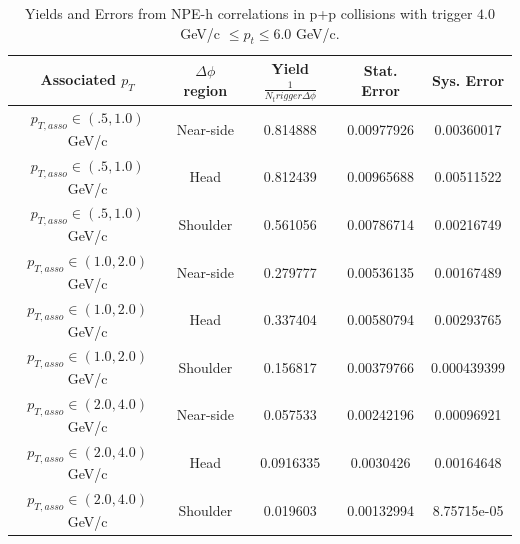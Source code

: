 \begin{table}
\centering
\begin{tabular}{|c|c|c|c|c|}
\hline
Associated $p_T$	& $\Delta\phi$ region & Yield $\frac{1}{N_trigger \Delta\phi}$ & Stat. Error & Sys. Error\\
\hline
$p_{T,asso} \in(.5, 1.0)$ GeV/c  & Near-side  &  0.814888 & 0.00977926 & 0.00360017 \\
\hline
$p_{T,asso} \in(.5, 1.0)$ GeV/c  & Head  &  0.812439 & 0.00965688 & 0.00511522 \\
\hline
$p_{T,asso} \in(.5, 1.0)$ GeV/c  & Shoulder & 0.561056 & 0.00786714 & 0.00216749\\ 
\hline
$p_{T,asso} \in(1.0, 2.0)$ GeV/c  & Near-side & 0.279777 & 0.00536135 & 0.00167489 \\ 
\hline
$p_{T,asso} \in(1.0, 2.0)$ GeV/c  & Head & 0.337404 & 0.00580794 & 0.00293765 \\
\hline
$p_{T,asso} \in(1.0, 2.0)$ GeV/c  & Shoulder & 0.156817 & 0.00379766 & 0.000439399 \\ 
\hline
$p_{T,asso} \in(2.0, 4.0)$ GeV/c  & Near-side & 0.057533 & 0.00242196 & 0.00096921 \\
\hline
$p_{T,asso} \in(2.0, 4.0)$ GeV/c  & Head & 0.0916335 & 0.0030426 & 0.00164648 \\
\hline
$p_{T,asso} \in(2.0, 4.0)$ GeV/c  & Shoulder & 0.019603 & 0.00132994 & 8.75715e-05 \\
\hline
\end{tabular}
\caption[Yields and Errors in p+p Correlations, Low Trigger]{Yields and Errors from NPE-h correlations in p+p collisions with trigger $4.0 $GeV/c $\leq p_t \leq 6.0$ GeV/c.}
\label{tab:ppyieldlow}
\end{table} 

